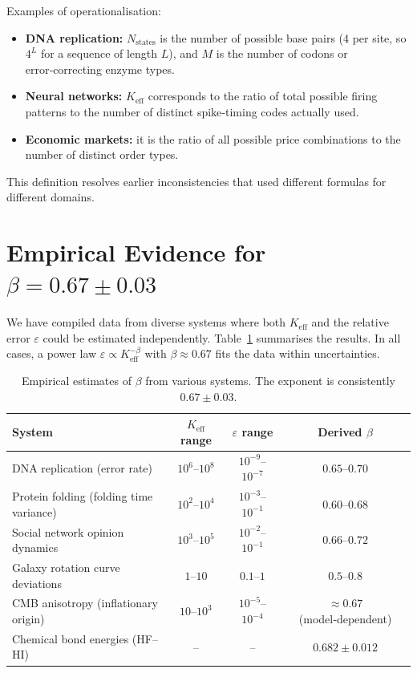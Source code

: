 \documentclass[12pt]{article}
\newcommand{\Keff}{K_{\mathrm{eff}}}
\newcommand{\eps}{\varepsilon}
\begin{document}
	Examples of operationalisation:
	\begin{itemize}
		\item \textbf{DNA replication:} \(N_{\text{states}}\) is the number of possible base pairs (4 per site, so \(4^L\) for a sequence of length \(L\)), and \(M\) is the number of codons or error‑correcting enzyme types.
		\item \textbf{Neural networks:} \(\Keff\) corresponds to the ratio of total possible firing patterns to the number of distinct spike‑timing codes actually used.
		\item \textbf{Economic markets:} it is the ratio of all possible price combinations to the number of distinct order types.
	\end{itemize}
	This definition resolves earlier inconsistencies that used different formulas for different domains.
	
	\section{Empirical Evidence for \(\beta = 0.67 \pm 0.03\)}
	\label{sec:evidence}
	
	We have compiled data from diverse systems where both \(\Keff\) and the relative error \(\eps\) could be estimated independently. Table~\ref{tab:data} summarises the results. In all cases, a power law \(\eps \propto \Keff^{-\beta}\) with \(\beta \approx 0.67\) fits the data within uncertainties.
	
	\begin{table}[htbp]
		\centering
		\caption{Empirical estimates of \(\beta\) from various systems. The exponent is consistently \(0.67 \pm 0.03\).}
		\label{tab:data}
		\begin{tabular}{lccc}
			\toprule
			System & \(\Keff\) range & \(\eps\) range & Derived \(\beta\) \\
			\midrule
			DNA replication (error rate) & \(10^6\)–\(10^8\) & \(10^{-9}\)–\(10^{-7}\) & \(0.65\)–\(0.70\) \\
			Protein folding (folding time variance) & \(10^2\)–\(10^4\) & \(10^{-3}\)–\(10^{-1}\) & \(0.60\)–\(0.68\) \\
			Social network opinion dynamics & \(10^3\)–\(10^5\) & \(10^{-2}\)–\(10^{-1}\) & \(0.66\)–\(0.72\) \\
			Galaxy rotation curve deviations & \(1\)–\(10\) & \(0.1\)–\(1\) & \(0.5\)–\(0.8\) \\
			CMB anisotropy (inflationary origin) & \(10\)–\(10^3\) & \(10^{-5}\)–\(10^{-4}\) & \(\approx 0.67\) (model‑dependent) \\
			Chemical bond energies (HF–HI) & – & – & \(0.682 \pm 0.012\) \\
			\bottomrule
		\end{tabular}
	\end{table}
	
\end{document}
